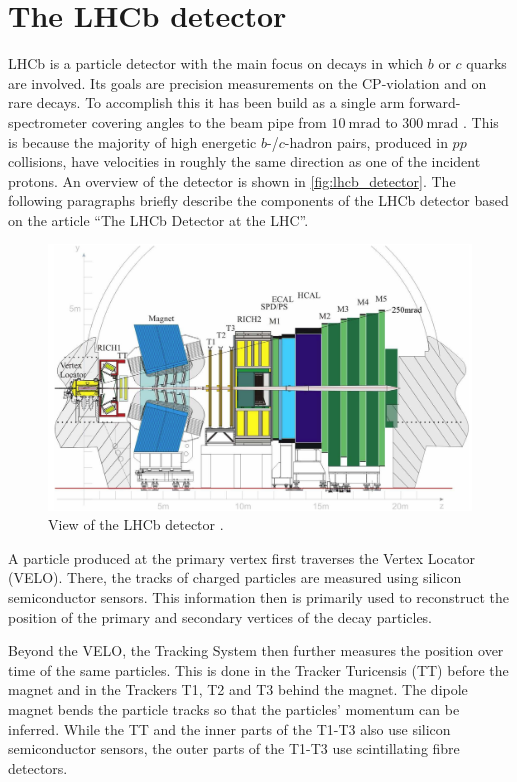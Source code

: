 \section{The LHCb detector}

LHCb is a particle detector with the main focus on decays in which $b$ or $c$ quarks are involved.
Its goals are precision measurements on the CP-violation and on rare decays. 
To accomplish this it has been build as a single arm forward-spectrometer covering angles to the beam pipe from $\qty{10}{\milli\radian}$ to $\qty{300}{\milli\radian}$ \cite{LHCb}. 
This is because the majority of high energetic $b$-/$c$-hadron pairs, produced in $pp$ collisions, have velocities in roughly the same direction as one of the incident protons.
An overview of the detector is shown in \autoref{fig:lhcb_detector}.
The following paragraphs briefly describe the components of the LHCb detector based on the article \enquote{The LHCb Detector at the LHC}\cite{LHCb}.

\begin{figure}
    \centering
    \includegraphics[width=\textwidth]{images/lhcb_detector.png}
    \caption{View of the LHCb detector \cite{LHCb}. }
    \label{fig:lhcb_detector}
\end{figure}

A particle produced at the primary vertex first traverses the Vertex Locator (VELO). 
There, the tracks of charged particles are measured using silicon semiconductor sensors. 
This information then is primarily used to reconstruct the position of the primary and secondary vertices of the decay particles.

Beyond the VELO, the Tracking System then further measures the position over time of the same particles. 
This is done in the Tracker Turicensis (TT) before the magnet and in the Trackers T1, T2 and T3 behind the magnet.
The dipole magnet bends the particle tracks so that the particles' momentum can be inferred.
While the TT and the inner parts of the T1-T3 also use silicon semiconductor sensors, the outer parts of the T1-T3 use scintillating fibre detectors.

